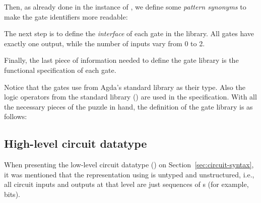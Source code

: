             \begin{center}
            \end{center}

            Then, as already done in the instance of , we define some \emph{pattern synonyms}
            to make the gate identifiers more readable:

            \begin{center}
            \end{center}

            The next step is to define the \emph{interface} of each gate in the library.
            All gates have exactly one output, while the number of inputs vary from 0 to 2.

            \begin{center}
            \end{center}

            Finally, the last piece of information needed to define the gate library is
            the functional specification of each gate.

            \begin{center}
            \end{center}

            Notice that the gates use  from Agda's standard library as their  type.
            Also the logic operators from the standard library () are used in the specification.
            With all the necessary pieces of the puzzle in hand, the definition of the 
            gate library is as follows:

            \begin{center}
            \end{center}


        \subsection{High-level circuit datatype}
        \label{subsec:high-level-circuit}
            When presenting the low-level circuit datatype () on Section~\ref{sec:circuit-syntax},
            it was mentioned that the representation using  is untyped and unstructured, i.e.,
            all circuit inputs and outputs at that level are just sequences of s (for example, bits).

